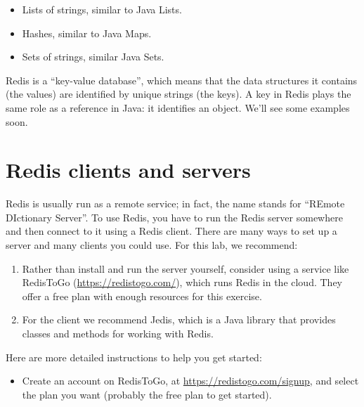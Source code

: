 \documentclass[12pt]{book}
\theoremstyle{exercise}
\begin{document}
{{{\begin{itemize}

\item
  Lists of strings, similar to Java Lists.

\item
  Hashes, similar to Java Maps.

\item
  Sets of strings, similar Java Sets.

\end{itemize}

Redis is a ``key-value database'', which means that the data structures
it contains (the values) are identified by unique strings (the keys). A
key in Redis plays the same role as a reference in Java: it identifies
an object. We'll see some examples soon.


\section{Redis clients and servers}
\label{redis-clients-and-servers}

Redis is usually run as a remote service; in fact, the name stands for
``REmote DIctionary Server''. To use Redis, you have to run the Redis
server somewhere and then connect to it using a Redis client. There are
many ways to set up a server and many clients you could use. For this
lab, we recommend:

\begin{enumerate}

\item
  Rather than install and run the server yourself, consider using a
  service like RedisToGo (\url{https://redistogo.com/}), which runs
  Redis in the cloud. They offer a free plan with enough resources for
  this exercise.

\item
  For the client we recommend Jedis, which is a Java library that
  provides classes and methods for working with Redis.

\end{enumerate}

Here are more detailed instructions to help you get started:

\begin{itemize}

\item Create an account on RedisToGo, at
  \url{https://redistogo.com/signup},
  and select the plan you want (probably the free plan to get started).


\end{itemize}}}}
\end{document}
